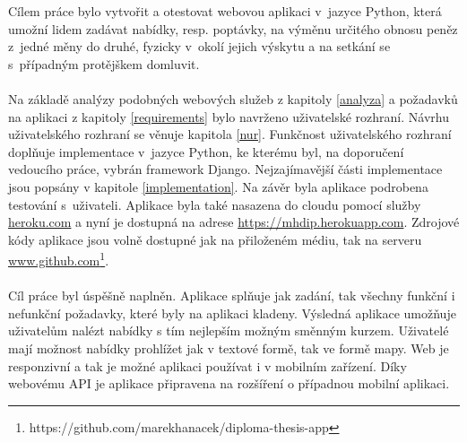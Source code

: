 \begin{conclusion}
Cílem práce bylo vytvořit a otestovat webovou aplikaci v~jazyce Python, která umožní lidem zadávat nabídky, resp. poptávky, na výměnu určitého obnosu peněz z~jedné měny do druhé, fyzicky v~okolí jejich výskytu a na setkání se s~případným protějškem domluvit.
\\\\
Na základě analýzy podobných webových služeb z kapitoly \ref{analyza} a požadavků na aplikaci z kapitoly \ref{requirements} bylo navrženo uživatelské rozhraní. Návrhu uživatelského rozhraní se věnuje kapitola \ref{nur}. Funkčnost uživatelského rozhraní doplňuje implementace v~jazyce Python, ke kterému byl, na doporučení vedoucího práce, vybrán framework Django. Nejzajímavější části implementace jsou popsány v kapitole \ref{implementation}. Na závěr byla aplikace podrobena testování s~uživateli. Aplikace byla také nasazena do cloudu pomocí služby \url{heroku.com}\cite{heroku} a nyní je dostupná na adrese \url{https://mhdip.herokuapp.com}. Zdrojové kódy aplikace jsou volně dostupné jak na přiloženém médiu, tak na serveru \url{www.github.com}\footnote{https://github.com/marekhanacek/diploma-thesis-app}.
\\\\
Cíl práce byl úspěšně naplněn. Aplikace splňuje jak zadání, tak všechny funkční i nefunkční požadavky, které byly na aplikaci kladeny. Výsledná aplikace umožňuje uživatelům nalézt nabídky s tím nejlepším možným směnným kurzem. Uživatelé mají možnost nabídky prohlížet jak v textové formě, tak ve formě mapy. Web je responzivní a tak je možné aplikaci používat i v mobilním zařízení. Díky webovému API je aplikace připravena na rozšíření o případnou mobilní aplikaci.
\end{conclusion}